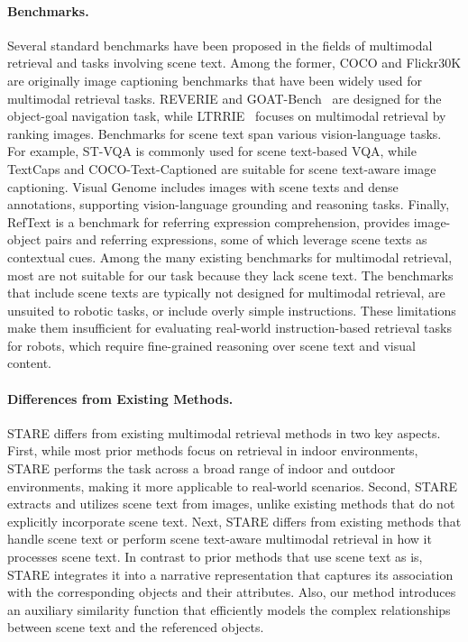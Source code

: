\paragraph{Benchmarks.}
Several standard benchmarks have been proposed in the fields of multimodal retrieval and tasks involving scene text.
Among the former, COCO \cite{Lin2014MicrosoftCC} and Flickr30K \cite{flickr30k} are originally image captioning benchmarks that have been widely used for multimodal retrieval tasks.
REVERIE \cite{qi2020reverie} and GOAT-Bench~\cite{khanna2024goatbench} are designed for the object-goal navigation task, while LTRRIE~\cite{multirankit} focuses on multimodal retrieval by ranking images.
Benchmarks for scene text span various vision-language tasks.
For example, ST-VQA \cite{stvqa} is commonly used for scene text-based VQA, while TextCaps \cite{textcaps} and COCO-Text-Captioned \cite{stacmr} are suitable for scene text-aware image captioning.
Visual Genome \cite{Krishna2017} includes images with scene texts and dense annotations, supporting vision-language grounding and reasoning tasks.
Finally, RefText \cite{stan} is a benchmark for referring expression comprehension, provides image-object pairs and referring expressions, some of which leverage scene texts as contextual cues.
Among the many existing benchmarks for multimodal retrieval, most are not suitable for our task because they lack scene text.
The benchmarks that include scene texts are typically not designed for multimodal retrieval, are unsuited to robotic tasks, or include overly simple instructions.
These limitations make them insufficient for evaluating real-world instruction-based retrieval tasks for robots, which require fine-grained reasoning over scene text and visual content.

\paragraph{Differences from Existing Methods.}
STARE differs from existing multimodal retrieval methods in two key aspects.
First, while most prior methods focus on retrieval in indoor environments, STARE performs the task across a broad range of indoor and outdoor environments, making it more applicable to real-world scenarios.
Second, STARE extracts and utilizes scene text from images, unlike existing methods that do not explicitly incorporate scene text.
Next, STARE differs from existing methods that handle scene text or perform scene text-aware multimodal retrieval in how it processes scene text.
In contrast to prior methods that use scene text as is, STARE integrates it into a narrative representation that captures its association with the corresponding objects and their attributes.
Also, our method introduces an auxiliary similarity function that efficiently models the complex relationships between scene text and the referenced objects.